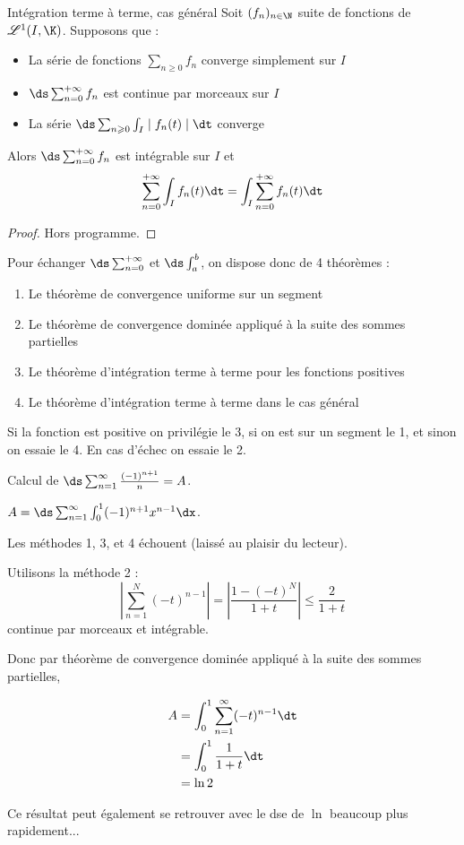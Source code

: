 \begin{theoreme}{Intégration terme à terme, cas général}{}
    Soit $(f_n)_{n \in \N}$ suite de fonctions de $\mathscr L^1(I, \K)$. Supposons que :
    \begin{itemize}
        \item La série de fonctions $\sum_{n \geqslant 0} f_n$ converge simplement sur $I$
        \item $\ds \sum_{n = 0}^{+ \infty} f_n$ est continue par morceaux sur $I$
        \item La série $\ds \sum_{n \geqslant 0 } \int_I \mid f_n(t) \mid \dt$ converge
    \end{itemize}
    Alors $\ds \sum_{n = 0 }^{+ \infty} f_n$ est intégrable sur $I$ et 
    $$\sum_{n = 0}^{+ \infty} \int_I f_n(t) \dt = \int_I \sum_{n = 0}^{+ \infty} f_n(t) \dt$$
\end{theoreme}

\begin{proof}
    Hors programme. 
\end{proof}

Pour échanger $\ds \sum_{n = 0}^{+ \infty}$ et $\ds \int_a^b$, on dispose donc de 4 théorèmes : 
\begin{enumerate}
    \item Le théorème de convergence uniforme sur un segment 
    \item Le théorème de convergence dominée appliqué à la suite des sommes partielles
    \item Le théorème d'intégration terme à terme pour les fonctions positives
    \item Le théorème d'intégration terme à terme dans le cas général
\end{enumerate}

Si la fonction est positive on privilégie le 3, si on est sur un segment le 1, et sinon 
on essaie le 4. En cas d'échec on essaie le 2. 

\begin{exemple}
    Calcul de $\ds \sum_{n = 1}^{\infty} \frac{(-1)^{n + 1}}{n} = A$. 

    $A = \ds \sum_{n = 1}^{\infty} \int_{0}^{1} (-1)^{n + 1} x^{n - 1} \dx$. 

    Les méthodes 1, 3, et 4 échouent (laissé au plaisir du lecteur).

    Utilisons la méthode 2 : 
    $$ \left| \sum_{n = 1}^{N } (-t)^{n - 1} \right| = \left| \frac{1 - (-t)^N}{1 + t} \right| \leqslant \frac{2}{1 + t}$$
    continue par morceaux et intégrable. 

    Donc par théorème de convergence dominée appliqué à la suite des sommes partielles, 

    \begin{align}
        A & = \int_{0}^{1} \sum_{n = 1}^{ \infty} (-t)^{n - 1} \dt \\
        & = \int_0^1 \frac{1}{1 + t} \dt \\
        & = \ln 2
    \end{align}

    Ce résultat peut également se retrouver avec le dse de $\ln$ beaucoup plus rapidement...
\end{exemple}

